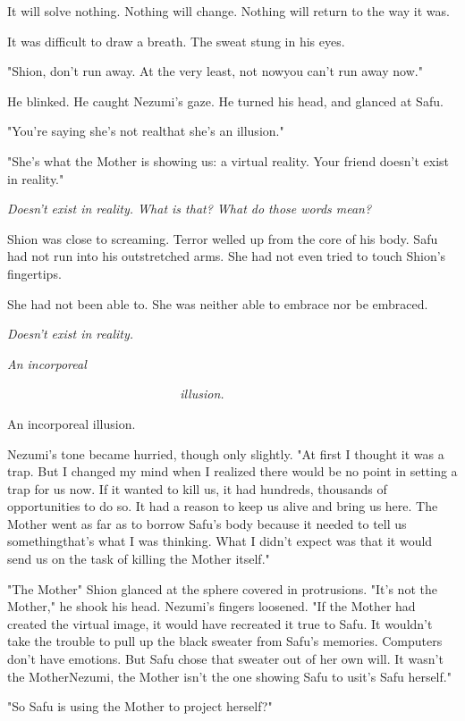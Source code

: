 It will solve nothing. Nothing will change. Nothing will return to the
way it was.

It was difficult to draw a breath. The sweat stung in his eyes.

"Shion, don't run away. At the very least, not now\el you can't run away
now."

He blinked. He caught Nezumi's gaze. He turned his head, and glanced at
Safu.

"\el You're saying she's not real\el that she's an illusion."

"She's what the Mother is showing us: a virtual reality. Your friend
doesn't exist in reality."

\emph{Doesn't exist in reality. What is that? What do those words mean?}

Shion was close to screaming. Terror welled up from the core of his
body. Safu had not run into his outstretched arms. She had not even
tried to touch Shion's fingertips.

She had not been able to. She was neither able to embrace nor be
embraced.

\emph{Doesn't exist in reality.}

\emph{An incorporeal}

\emph{~~~~~~~~~~~~~~~~~~~~~~~~~~~illusion.}

An incorporeal illusion.

Nezumi's tone became hurried, though only slightly. "At first I thought
it was a trap. But I changed my mind when I realized there would be no
point in setting a trap for us now. If it wanted to kill us, it had
hundreds, thousands of opportunities to do so. It had a reason to keep
us alive and bring us here. The Mother went as far as to borrow Safu's
body because it needed to tell us something\el that's what I was
thinking. What I didn't expect was that it would send us on the task of
killing the Mother itself."

"The Mother\el " Shion glanced at the sphere covered in protrusions.
"It's not the Mother," he shook his head. Nezumi's fingers loosened. "If
the Mother had created the virtual image, it would have recreated it
true to Safu. It wouldn't take the trouble to pull up the black sweater
from Safu's memories. Computers don't have emotions. But Safu chose that
sweater out of her own will. It wasn't the Mother\el Nezumi, the Mother
isn't the one showing Safu to us\el it's Safu herself."

"So Safu is using the Mother to project herself?"

